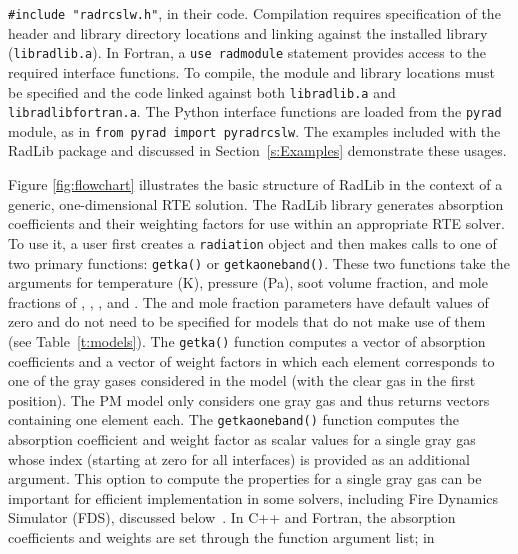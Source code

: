 \documentclass[preprint,12pt]{elsarticle}
\begin{document}
    \texttt{\#include "rad\textunderscore rcslw.h"}, in their code. Compilation requires specification of the header
    and library directory locations and linking against the installed library (\texttt{libradlib.a}). In Fortran,
    a \texttt{use rad\textunderscore module} statement provides access to the required interface functions. To
    compile, the module and library locations must be specified and the code linked against both
    \texttt{libradlib.a} and \texttt{libradlib\textunderscore fortran.a}. The Python interface functions are loaded
    from the \texttt{pyrad} module, as in \texttt{from pyrad import pyrad\textunderscore rcslw}. The examples
    included with the RadLib package and discussed in Section~\ref{s:Examples} demonstrate these usages.

    Figure \ref{fig:flowchart} illustrates the basic structure of RadLib in the context of a generic, one-dimensional
    RTE solution. The RadLib library generates absorption coefficients and their weighting factors for use within an
    appropriate RTE solver. To use it, a user first creates a \texttt{radiation} object and then makes calls to
    one of two primary functions: \texttt{get\textunderscore k\textunderscore a()} or \texttt{get\textunderscore k\textunderscore a\textunderscore oneband()}.
    These two functions take the arguments for temperature (K), pressure (Pa), soot volume fraction, and mole
    fractions of , , , and . The  and  mole fraction
    parameters have default values of zero and do not need to be specified for models that do not make use of them
    (see Table~\ref{t:models}). The \texttt{get\textunderscore k\textunderscore a()} function computes a vector of
    absorption coefficients and a vector of weight factors in which each element corresponds to one of the gray gases
    considered in the model (with the clear gas in the first position). The PM model only considers one gray gas and
    thus returns vectors containing one element each.
    The \texttt{get\textunderscore k\textunderscore a\textunderscore oneband()} function computes the
    absorption coefficient and weight factor as scalar values for a single gray gas whose index
    (starting at zero for all interfaces) is provided as an additional argument. This option to compute the
    properties for a single gray gas can be important for efficient implementation in some solvers, including Fire
    Dynamics Simulator (FDS), discussed below~\cite{FDS}.
    In C++ and Fortran, the absorption coefficients and weights are set through the function argument list; in
\end{document}

